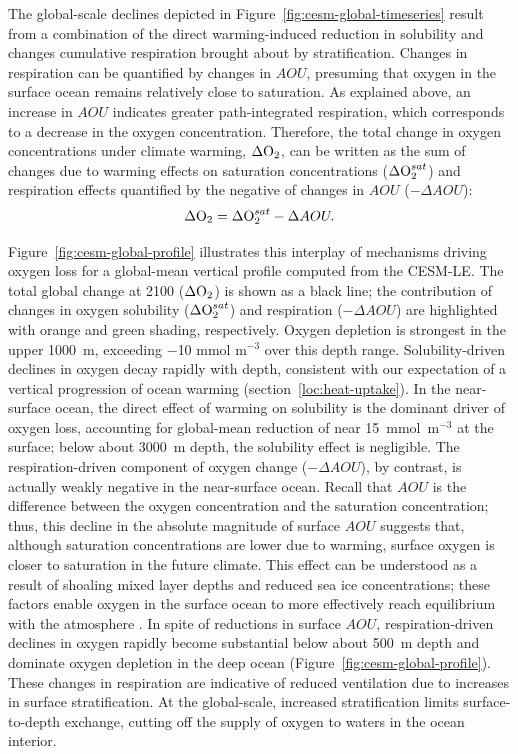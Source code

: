 \documentclass[draft,linenumbers]{report_chapter}
\begin{document}
The global-scale  declines depicted in Figure~\ref{fig:cesm-global-timeseries} result from a combination of the direct warming-induced reduction in solubility and changes cumulative respiration brought about by stratification.
Changes in respiration can be quantified by changes in $AOU$, presuming that oxygen in the surface ocean remains relatively close to saturation.
As explained above, an increase in $AOU$ indicates greater path-integrated respiration, which corresponds to a decrease in the oxygen concentration.
Therefore, the total change in oxygen concentrations under climate warming, $\Delta\ce{O2}$, can be written as the sum of changes due to warming effects on saturation concentrations ($\Delta\ce{O2}^{sat}$) and respiration effects quantified by the negative of changes in $AOU$ ($-\Delta AOU$):
\begin{equation}
\Delta\ce{O2} = \Delta\ce{O2}^{sat} - \Delta AOU.
\label{eqn:o2-change}
\end{equation}

Figure~\ref{fig:cesm-global-profile} illustrates this interplay of mechanisms driving oxygen loss for a global-mean vertical profile computed from the CESM-LE.
The total global  change at 2100 ($\Delta\ce{O2}$) is shown as a black line; the contribution of changes in oxygen solubility ($\Delta\ce{O2}^{sat}$) and respiration ($-\Delta{}AOU$) are highlighted with orange and green shading, respectively.
Oxygen depletion is strongest in the upper 1000~m, exceeding $-$10 mmol m$^{-3}$ over this depth range.
Solubility-driven declines in oxygen decay rapidly with depth, consistent with our expectation of a vertical progression of ocean warming (section~\ref{loc:heat-uptake}).
In the near-surface ocean, the direct effect of warming on solubility is the dominant driver of oxygen loss, accounting for global-mean reduction of near 15~mmol~m$^{-3}$ at the surface; below about 3000~m depth, the solubility effect is negligible.
The respiration-driven component of oxygen change ($-\Delta{}AOU$), by contrast, is actually weakly negative in the near-surface ocean.
Recall that $AOU$ is the difference between the oxygen concentration and the saturation concentration; thus, this decline in the absolute magnitude of surface $AOU$ suggests that, although saturation concentrations are lower due to warming, surface oxygen is closer to saturation in the future climate.
This effect can be understood as a result of shoaling mixed layer depths and reduced sea ice concentrations; these factors enable oxygen in the surface ocean to more effectively reach equilibrium with the atmosphere \citep{Ito-Follows-etal-2004}.
In spite of reductions in surface $AOU$, respiration-driven declines in oxygen rapidly become substantial below about 500~m depth and dominate oxygen depletion in the deep ocean (Figure~\ref{fig:cesm-global-profile}).
These changes in respiration are indicative of reduced ventilation due to increases in surface stratification.
At the global-scale, increased stratification limits surface-to-depth exchange, cutting off the supply of oxygen to waters in the ocean interior.
\end{document}
